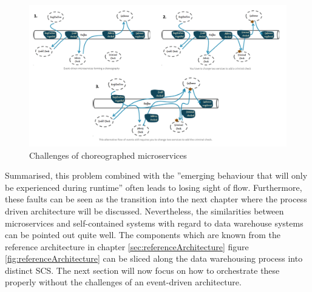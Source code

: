 \begin{figure}[!htb]
    \centering
    \includegraphics[scale=0.33]{pictures/FlowOfEvents.png}
    \caption{Challenges of choreographed microservices \cite{eventDrivenMicroservices}}
    \label{fig:chalengesChoreographedMicroservices}
\end{figure}

Summarised, this problem combined with the ''emerging behaviour that will only be experienced during runtime'' \cite{eventDrivenMicroservices} often leads to losing sight of flow.\newline
Furthermore, these faults can be seen as the transition into the next chapter where the process driven architecture will be discussed. Nevertheless, the similarities between microservices and self-contained systems with regard to data warehouse systems can be pointed out quite well. The components which are known from the reference architecture in chapter \ref{sec:referenceArchitecture} figure \ref{fig:referenceArchitecture} can be sliced along the data warehousing process into distinct SCS.\newline
The next section will now focus on how to orchestrate these properly without the challenges of an event-driven architecture. 